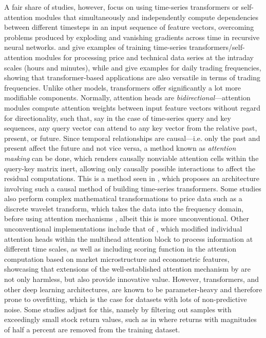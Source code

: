 \documentclass[stu,floatsintext]{apa7}
\begin{document}
A fair share of studies, however, focus on using time-series transformers or self-attention modules that simultaneously and independently compute dependencies between different timesteps in an input sequence of feature vectors, overcoming problems produced by exploding and vanishing gradients across time in recursive neural networks. \textcite{li2025transformer} and \textcite{vogel2025transformerbased} give examples of training time-series transformers/self-attention modules for processing price and technical data series at the intraday scales (hours and minutes), while \textcite{chen2026newsdriven} and \textcite{bustarviejo2026multimodal} give examples for daily trading frequencies, showing that transformer-based applications are also versatile in terms of trading frequencies. Unlike other models, transformers offer significantly a lot more modifiable components. Normally, attention heads are \textit{bidirectional}—attention modules compute attention weights between input feature vectors without regard for directionality, such that, say in the case of time-series query and key sequences, any query vector can attend to any key vector from the relative past, present, or future. Since temporal relationships are causal—i.e. only the past and present affect the future and not vice versa, a method known as \textit{attention masking} can be done, which renders causally nonviable attention cells within the query-key matrix inert, allowing only causally possible interactions to affect the residual computations. This is a method seen in \textcite{wang2025timedart}, which proposes an architecture involving such a causal method of building time-series transformers. Some studies also perform complex mathematical transformations to price data such as a discrete wavelet transform, which takes the data into the frequency domain, before using attention mechanisms \parencite{chen2026newsdriven}, albeit this is more unconventional. Other unconventional implementations include that of \textcite{vogel2025transformerbased}, which modified individual attention heads within the multihead attention block to process information at different time scales, as well as including scoring function in the attention computation based on market microstructure and econometric features, showcasing that extensions of the well-established attention mechanism by \textcite{vaswani2017attention} are not only harmless, but also provide innovative value. However, transformers, and other deep learning architectures, are known to be parameter-heavy and therefore prone to overfitting, which is the case for datasets with lots of non-predictive noise. Some studies adjust for this, namely by filtering out samples with exceedingly small stock return values, such as in \textcite{albada2025predicting} where returns with magnitudes of half a percent are removed from the training dataset.
\end{document}
